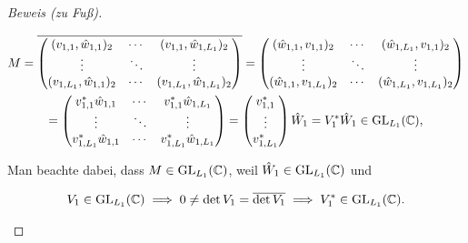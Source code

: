 \begin{proof}[Beweis (zu Fuß)]
\begin{enumerate}[label = (\roman*)]
        \begin{multline*}
            M
            =
            \overline
            {
                \begin{pmatrix}
                    (v_{1,   1}, \hat w_{1, 1})_2 & \cdots & (v_{1,   1}, \hat w_{1, L_1})_2 \\
                    \vdots                        & \ddots & \vdots                          \\
                    (v_{1, L_1}, \hat w_{1, 1})_2 & \cdots & (v_{1, L_1}, \hat w_{1, L_1})_2 \\
                \end{pmatrix}
            }
            =
            \begin{pmatrix}
                (\hat w_{1, 1}, v_{1,   1})_2 & \cdots & (\hat w_{1, L_1}, v_{1,   1})_2 \\
                \vdots                        & \ddots & \vdots                          \\
                (\hat w_{1, 1}, v_{1, L_1})_2 & \cdots & (\hat w_{1, L_1}, v_{1, L_1})_2 \\
            \end{pmatrix} \\
            =
            \begin{pmatrix}
                v_{1,   1}^\ast \hat w_{1, 1} & \cdots & v_{1,   1}^\ast \hat w_{1, L_1} \\
                \vdots                        & \ddots & \vdots                        \\
                v_{1, L_1}^\ast \hat w_{1, 1} & \cdots & v_{1, L_1}^\ast \hat w_{1, L_1} \\
            \end{pmatrix}
            =
            \begin{pmatrix}
                v_{1, 1}^\ast \\ \vdots \\ v_{1, L_1}^\ast
            \end{pmatrix}
            \hat W_1
            =
            V_1^\ast \hat W_1
            \in
            \operatorname{GL}_{L_1}(\mathbb{C}),
        \end{multline*}

        Man beachte dabei, dass $M \in \operatorname{GL}_{L_1}(\mathbb{C})$, weil $\hat W_1 \in \operatorname{GL}_{L_1}(\mathbb{C})$ und

        \begin{align*}
            V_1 \in \operatorname{GL}_{L_1}(\mathbb{C})
            \implies
            0 \neq \det V_1 = \overline{\det V_1}
            \implies
            V_1^\ast \in \operatorname{GL}_{L_1}(\mathbb{C}).
        \end{align*}


\end{enumerate}
\end{proof}

